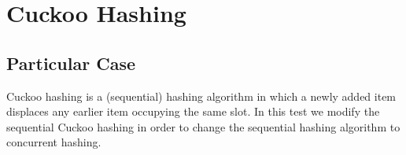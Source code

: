 


\section{\textbf{Cuckoo Hashing}}



\subsection{Particular Case}
\par
Cuckoo hashing is a (sequential) hashing algorithm in which a newly added item displaces any earlier item occupying the same slot. 
In this test we modify the sequential Cuckoo hashing in order to change the sequential hashing algorithm to concurrent hashing.
\par



